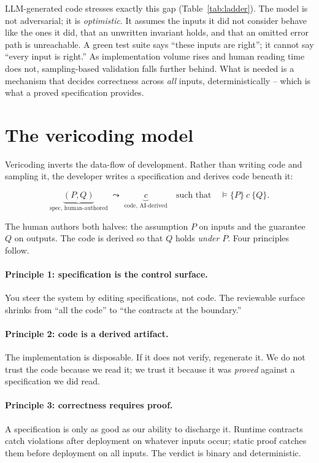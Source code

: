 \documentclass[sigconf,nonacm]{acmart}
\newcommand{\hoare}[3]{\{#1\}\ #2\ \{#3\}}
\begin{document}
LLM-generated code stresses exactly this gap (Table~\ref{tab:ladder}). The model
is not adversarial; it is \emph{optimistic}. It assumes the inputs it did not
consider behave like the ones it did, that an unwritten invariant holds, and that
an omitted error path is unreachable. A green test suite says ``these inputs are
right''; it cannot say ``every input is right.'' As implementation volume rises
and human reading time does not, sampling-based validation falls further behind.
What is needed is a mechanism that decides correctness across \emph{all} inputs,
deterministically -- which is what a proved specification provides.

\section{The vericoding model}
\label{sec:model}

Vericoding inverts the data-flow of development. Rather than writing code and
sampling it, the developer writes a specification and derives code beneath it:

\[
\underbrace{(P, Q)}_{\text{spec, human-authored}} \;\leadsto\;
\underbrace{c}_{\text{code, AI-derived}}
\quad\text{such that}\quad \vDash \hoare{P}{c}{Q}.
\]

The human authors both halves: the assumption $P$ on inputs and the guarantee $Q$
on outputs. The code is derived so that $Q$ holds \emph{under} $P$. Four
principles follow.

\paragraph{Principle 1: specification is the control surface.} You steer the
system by editing specifications, not code. The reviewable surface shrinks from
``all the code'' to ``the contracts at the boundary.''

\paragraph{Principle 2: code is a derived artifact.} The implementation is
disposable. If it does not verify, regenerate it. We do not trust the code
because we read it; we trust it because it was \emph{proved} against a
specification we did read.

\paragraph{Principle 3: correctness requires proof.} A specification is only as
good as our ability to discharge it. Runtime contracts catch violations after
deployment on whatever inputs occur; static proof catches them before deployment
on all inputs. The verdict is binary and deterministic.
\end{document}
